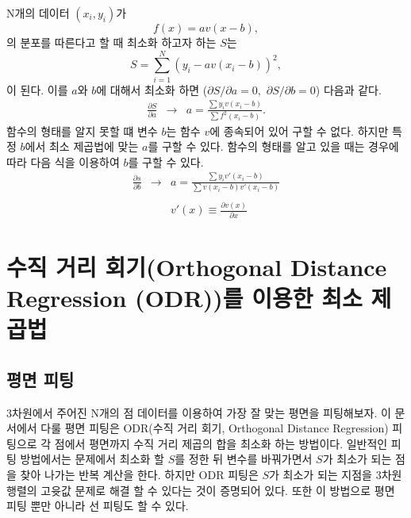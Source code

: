 \documentclass[chapter,a4paper,12pt]{oblivoir}
\begin{document}
N개의 데이터 $(x_i, y_i)$가
\begin{equation}
f(x) = av(x-b),
\end{equation}
의 분포를 따른다고 할 때 최소화 하고자 하는 $S$는
\begin{equation}
S = \sum_{i=1}^N \left(y_i - av(x_i - b)\right)^2,
\end{equation}
이 된다. 이를 $a$와 $b$에 대해서 최소화 하면 
(${\partial S}/{\partial a} = 0,\,\,{\partial S}/{\partial b} = 0$) 
다음과 같다.
\begin{eqnarray}
\frac{\partial S}{\partial a} &\longrightarrow& a = \frac{\sum y_i v(x_i - b)}{\sum f^2(x_i - b)}.%
\end{eqnarray}
함수의 형태를 알지 못할 떄 변수 $b$는 함수 $v$에 종속되어 있어 구할 수 없다. 하지만 특정 $b$에서 최소 제곱법에 맞는 $a$를 구할 수 있다.
함수의 형태를 알고 있을 때는 경우에 따라 다음 식을 이용하여 $b$를 구할 수 있다.
\begin{eqnarray}
\frac{\partial s}{\partial b} &\longrightarrow& a = \frac{\sum y_i v'(x_i - b)}{\sum v(x_i - b)v'(x_i - b)}\\\nonumber\\
&&v'(x) \equiv \frac{\partial v(x)}{\partial x}
\end{eqnarray}

\chapter{수직 거리 회기(Orthogonal Distance Regression (ODR))를 이용한 최소 제곱법}
\section{평면 피팅}\label{section_fitplane}

3차원에서 주어진 N개의 점 데이터를 이용하여 가장 잘 맞는 평면을 피팅해보자.
이 문서에서 다룰 평면 피팅은 ODR(수직 거리 회기, Orthogonal Distance Regression) 피팅으로
각 점에서 평면까지 수직 거리 제곱의 합을 최소화 하는 방법이다.
일반적인 피팅 방법에서는 문제에서 최소화 할 $S$를 정한 뒤 변수를 바꿔가면서
$S$가 최소가 되는 점을 찾아 나가는 반복 계산을 한다.
하지만 ODR 피팅은 $S$가 최소가 되는 지점을 3차원 행렬의 고윳값 문제로 해결 할 수 있다는 것이 증명되어 있다.
또한 이 방법으로 평면 피팅 뿐만 아니라 선 피팅도 할 수 있다.
\end{document}
